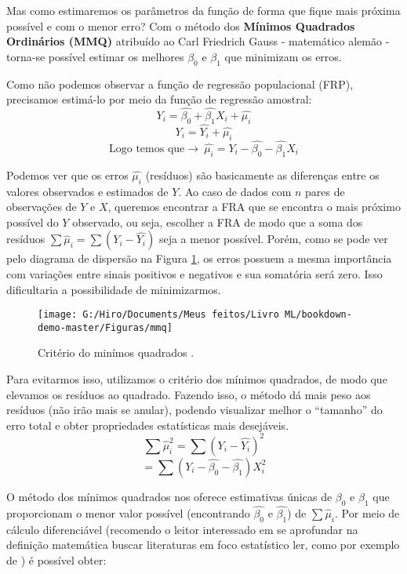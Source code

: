 \documentclass[
]{book}
\begin{document}
Mas como estimaremos os parâmetros da função de forma que fique mais próxima possível e com o menor erro? Com o método dos \textbf{Mínimos Quadrados Ordinários (MMQ)} atribuído ao Carl Friedrich Gauss - matemático alemão - torna-se possível estimar os melhores \(\beta_0\) e \(\beta_1\) que minimizam os erros.

Como não podemos observar a função de regressão populacional (FRP), precisamos estimá-lo por meio da função de regressão amostral:
\[Y_i=\hat{\beta_0}+\hat{\beta_1}X_i+\hat{\mu_i} \]
\[Y_i=\hat{Y_i}+\hat{\mu_i}\]
\[\mbox{Logo temos que} \rightarrow \ \hat{\mu_i}=Y_i-\hat{\beta_0}-\hat{\beta_1} X_i\]

Podemos ver que os erros \(\hat{\mu_i}\) (resíduos) são basicamente as diferenças entre os valores observados e estimados de \(Y\). Ao caso de dados com \(n\) pares de observações de \(Y\) e \(X\), queremos encontrar a FRA que se encontra o mais próximo possível do \(Y\) observado, ou seja, escolher a
FRA de modo que a soma dos resíduos \(\sum \hat{\mu}_i=\sum(Y_i-\hat{Y_i})\) seja a menor possível. Porém, como se pode ver pelo diagrama de dispersão na Figura \ref{fig:mmq}, os erros possuem a mesma importância com variações entre sinais positivos e negativos e sua somatória será zero. Isso dificultaria a possibilidade de minimizarmos.

\begin{figure}

{\centering \texttt{[image: G:/Hiro/Documents/Meus feitos/Livro ML/bookdown-demo-master/Figuras/mmq]} 

}

\caption{Critério do minímos quadrados \citet{gujarati2011econometria}.}\label{fig:mmq}
\end{figure}



Para evitarmos isso, utilizamos o critério dos mínimos quadrados, de modo que elevamos os resíduos ao quadrado. Fazendo isso, o método dá mais peso aos resíduos (não irão mais se anular), podendo visualizar melhor o ``tamanho'' do erro total e obter propriedades estatísticas mais desejáveis.
\[\sum \hat{\mu}^2_i=\sum(Y_i-\hat{Y_i})^2 \]
\begin{equation}
    = \sum (Y_i-\hat{\beta_0}-\hat{\beta_1})X_i^2 
    \label{eq:mmqeq}
\end{equation}

O método dos mínimos quadrados nos oferece estimativas únicas de \(\beta_0\) e \(\beta_1\) que proporcionam o menor valor possível (encontrando \(\hat{\beta_0}\) e \(\hat{\beta_1}\)) de \(\sum \hat{\mu}_i\). Por meio de cálculo diferenciável (recomendo o leitor interessado em se aprofundar na definição matemática buscar literaturas em foco estatístico ler, como por exemplo de \citet{gujarati2011econometria}) é possível obter:
\end{document}
